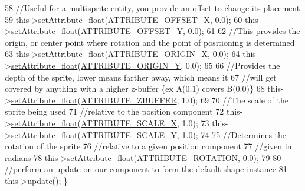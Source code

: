 \begin{DoxyCode}
58         \textcolor{comment}{//Useful for a multisprite entity, you provide an offset to change its placement}
59     this->\hyperlink{class_abstract_component_aadaf9dfbb371db5fb21f9c7cf2cbea98}{setAttribute\_float}(\hyperlink{_a_e___attributes_8h_aa003b6ad3f43053c9d43e1acc0098691}{ATTRIBUTE\_OFFSET\_X}, 0.0);
60     this->\hyperlink{class_abstract_component_aadaf9dfbb371db5fb21f9c7cf2cbea98}{setAttribute\_float}(\hyperlink{_a_e___attributes_8h_a8ebf91b8ee9dfdfad18bc10c3c42d564}{ATTRIBUTE\_OFFSET\_Y}, 0.0);
61 
62     \textcolor{comment}{//This provides the origin, or center point where rotation and the point of positioning is determined}
63     this->\hyperlink{class_abstract_component_aadaf9dfbb371db5fb21f9c7cf2cbea98}{setAttribute\_float}(\hyperlink{_a_e___attributes_8h_a5c5a5ae3ea4130db3dfd08029a17a17c}{ATTRIBUTE\_ORIGIN\_X}, 0.0);
64     this->\hyperlink{class_abstract_component_aadaf9dfbb371db5fb21f9c7cf2cbea98}{setAttribute\_float}(\hyperlink{_a_e___attributes_8h_af45315d7cdc2f4ecdb28d0a9d6bb15c7}{ATTRIBUTE\_ORIGIN\_Y}, 0.0);
65 
66     \textcolor{comment}{//Provides the depth of the sprite, lower means farther away, which means it}
67         \textcolor{comment}{//will get covered by anything with a higher z-buffer \{ex A(0.1) covers B(0.0)\}}
68     this->\hyperlink{class_abstract_component_aadaf9dfbb371db5fb21f9c7cf2cbea98}{setAttribute\_float}(\hyperlink{_a_e___attributes_8h_af11539bb711833d6321aaccd369e9e4b}{ATTRIBUTE\_ZBUFFER}, 1.0);
69 
70     \textcolor{comment}{//The scale of the sprite being used}
71         \textcolor{comment}{//relative to the position component}
72     this->\hyperlink{class_abstract_component_aadaf9dfbb371db5fb21f9c7cf2cbea98}{setAttribute\_float}(\hyperlink{_a_e___attributes_8h_a8104e81b9e1e7fd7e21f1f5f850ca636}{ATTRIBUTE\_SCALE\_X}, 1.0);
73     this->\hyperlink{class_abstract_component_aadaf9dfbb371db5fb21f9c7cf2cbea98}{setAttribute\_float}(\hyperlink{_a_e___attributes_8h_aa800ca9799c1b216f086becf36509ea5}{ATTRIBUTE\_SCALE\_Y}, 1.0);
74 
75     \textcolor{comment}{//Determines the rotation of the sprite}
76         \textcolor{comment}{//relative to a given position component}
77         \textcolor{comment}{//given in radians}
78     this->\hyperlink{class_abstract_component_aadaf9dfbb371db5fb21f9c7cf2cbea98}{setAttribute\_float}(\hyperlink{_a_e___attributes_8h_a70254d936ce8b3662e1a7472c36832d5}{ATTRIBUTE\_ROTATION}, 0.0);
79 
80     \textcolor{comment}{//perform an update on our component to form the default shape instance}
81     this->\hyperlink{class_shape_component_ae62aa31a3d5c65c675243fdcc5f60904}{update}();
\}
\end{DoxyCode}


